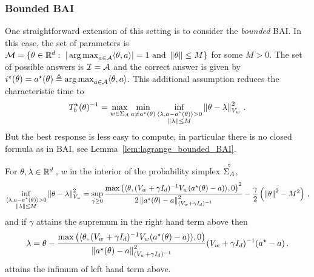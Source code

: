 \subsubsection{Bounded BAI}
\label{app:bounded_bai}
One straightforward extension of this setting is to consider the \emph{bounded} BAI. In this case, the set of parameters is $\mathcal{M}=\{\theta \in \mathbb{R}^d:\ |\operatorname*{arg\,max}_{a\in\mathcal{A}} \langle\theta,a\rangle|=1 \text{ and } \left\lVert\theta\right\rVert\leq M\}$ for some $M>0$. The set of possible answers is $\mathcal{I} = \mathcal{A}$ and the correct answer is given by $i^\star(\theta)=a^\star(\theta)\triangleq \operatorname*{arg\,max}_{a\in\mathcal{A}} \langle\theta,a\rangle$.
This additional assumption reduces the characteristic time to
\[
T^{\star}_b(\theta)^{-1} = \max_{w\in\Sigma_A} \min_{a\neq a^\star(\theta)} \inf_{\substack{\langle \lambda,a-a^\star(\theta)\rangle>0\\ \left\lVert\lambda\right\rVert\leq M}} \left\lVert\theta -\lambda \right\rVert_{V_w}^2 \,.
\]
But the best response is less easy to compute, in particular there is no closed formula as in BAI, see Lemma~\ref{lem:lagrange_bounded_BAI}.
\begin{lemma}
  \label{lem:lagrange_bounded_BAI}
For $\theta, \lambda \in \mathbb{R}^d\,$, $w$ in the interior of the probability simplex $\overset{\circ}{\Sigma_A}$,
\[
\inf_{\substack{\langle \lambda,a-a^\star(\theta)\rangle>0\\ \left\lVert\lambda\right\rVert\leq M}} \left\lVert\theta -\lambda \right\rVert_{V_w}^2 = \sup_{\gamma\geq 0} \frac{\max\left(\langle \theta, (V_w+\gamma I_d)^{-1} V_w (a^\star(\theta)-a)\rangle,0\right)^2 }{2\left\lVert a^\star(\theta)-a\right\rVert^2_{(V_w+\gamma I_d)^{-1}}}- \frac{\gamma}{2}\left(\left\lVert\theta\right\rVert^2-M^2\right)\,,
\]
and if $\gamma$ attains the supremum in the right hand term above then
\[
\lambda = \theta - \frac{\max\left(\langle \theta, (V_w+\gamma I_d)^{-1} V_w (a^\star(\theta)-a)\rangle,0\right)}{\left\lVert a^\star(\theta)-a\right\rVert^2_{(V_w+\gamma I_d)^{-1}}} (V_w+\gamma I_d)^{-1}(a^\star - a)\,.
\]
attains the infimum of left hand term above.
\end{lemma}
